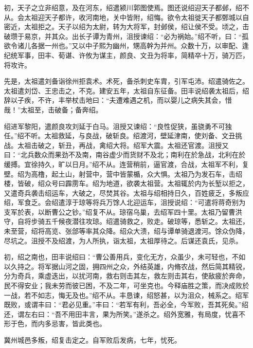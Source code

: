 \documentclass[12pt,UTF8]{ctexbook}
\begin{document}
初，天子之立非绍意，及在河东，绍遣颍川郭图使焉。图还说绍迎天子都邺，绍不从。会太祖迎天子都许，收河南地，关中皆附，绍悔。欲令太祖徙天子都鄄城以自密近，太祖拒之。天子以绍为太尉，转为大将军，封邺侯，绍让侯不受。顷之，击破瓒于易京，并其众。出长子谭为青州，沮授谏绍：“必为祸始。”绍不听，曰：“孤欲令诸儿各据一州也。”又以中子熙为幽州，甥高幹为并州。众数十万，以审配、逢纪统军事，田丰、荀谌、许攸为谋主，颜良、文丑为将率，简精卒十万，骑万匹，将攻许。

先是，太祖遣刘备诣徐州拒袁术。术死，备杀刺史车胄，引军屯沛。绍遣骑佐之。太祖遣刘岱、王忠击之，不克。建安五年，太祖自东征备。田丰说绍袭太祖后，绍辞以子疾，不许，丰举杖击地曰：“夫遭难遇之机，而以婴儿之病失其会，惜哉！”太祖至，击破备；备奔绍。

绍进军黎阳，遣颜良攻刘延于白马。沮授又谏绍：“良性促狭，虽骁勇不可独任。”绍不听。太祖救延，与良战，破斩良。绍渡河，壁延津南，使刘备、文丑挑战。太祖击破之，斩丑，再战，禽绍大将。绍军大震。太祖还官渡。沮授又曰：“北兵数众而果劲不及南，南谷虚少而货财不及北；南利在於急战，北利在於缓搏。宜徐持久，旷以日月。”绍不从。连营稍前，逼官渡，合战，太祖军不利，复壁。绍为高橹，起土山，射营中，营中皆蒙楯，众大惧。太祖乃为发石车，击绍楼，皆破，绍众号曰霹雳车。绍为地道，欲袭太祖营。太祖辄於内为长堑以拒之，又遣奇兵袭击绍运车，大破之，尽焚其谷。太祖与绍相持日久，百姓疲乏，多叛应绍，军食乏。会绍遣淳于琼等将兵万馀人北迎运车，沮授说绍：“可遣将蒋奇别为支军於表，以断曹公之钞。”绍复不从。琼宿乌巢，去绍军四十里。太祖乃留曹洪守，自将步骑五千候夜潜往攻琼。绍遣骑救之，败走。破琼等，悉斩之。太祖还，未至营，绍将高览、张郃等率其众降。绍众大溃，绍与谭单骑退渡河。馀众伪降，尽坑之。沮授不及绍渡，为人所执，诣太祖，太祖厚待之。后谋还袁氏，见杀。

初，绍之南也，田丰说绍曰：“曹公善用兵，变化无方，众虽少，未可轻也，不如以久持之。将军据山河之固，拥四州之众，外结英雄，内脩农战，然后简其精锐，分为奇兵，乘虚迭出，以扰河南，救右则击其左，救左则击其右，使敌疲於奔命，民不得安业；我未劳而彼已困，不及二年，可坐克也。今释庙胜之策，而决成败於一战，若不如志，悔无及也。”绍不从。丰恳谏，绍怒甚，以为沮众，械系之。绍军既败，或谓丰曰：“君必见重。”丰曰：“若军有利，吾必全，今军败，吾其死矣。”绍还，谓左右曰：“吾不用田丰言，果为所笑。”遂杀之。绍外宽雅，有局度，忧喜不形于色，而内多忌害，皆此类也。

冀州城邑多叛，绍复击定之。自军败后发病，七年，忧死。
\end{document}
